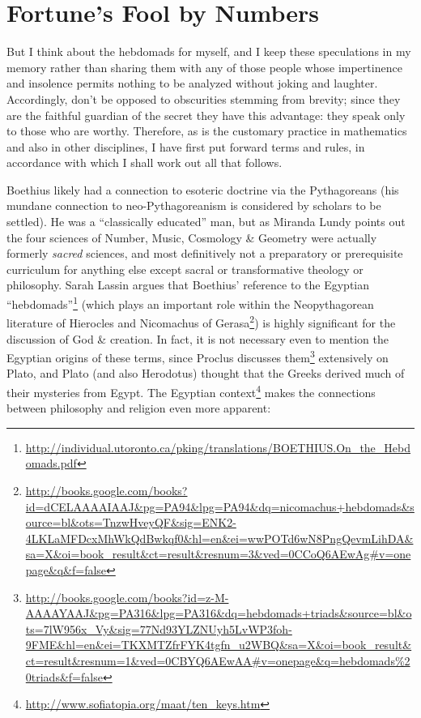 \section{Fortune’s Fool by Numbers}

\begin{quotex}
But I think about the hebdomads for myself, and I keep these speculations in my memory rather than sharing them with any of those people whose impertinence and insolence permits nothing to be analyzed without joking and laughter. Accordingly, don't be opposed to obscurities stemming from brevity; since they are the faithful guardian of the secret they have this advantage: they speak only to those who are worthy. Therefore, as is the customary practice in mathematics and also in other disciplines, I have first put forward terms and rules, in accordance with which I shall work out all that follows.
\end{quotex}


Boethius likely had a connection to esoteric doctrine via the Pythagoreans (his mundane connection to neo-Pythagoreanism is considered by scholars to be settled). He was a ``classically educated'' man, but as Miranda Lundy points out the four sciences of Number, Music, Cosmology \& Geometry were actually formerly \emph{sacred} sciences, and most definitively not a preparatory or prerequisite curriculum for anything else except sacral or transformative theology or philosophy. Sarah Lassin argues that Boethius' reference to the Egyptian ``hebdomads''\footnote{\url{http://individual.utoronto.ca/pking/translations/BOETHIUS.On\_the\_Hebdomads.pdf}} (which plays an important role within the Neopythagorean literature of Hierocles and Nicomachus of Gerasa\footnote{\url{http://books.google.com/books?id=dCELAAAAIAAJ\&pg=PA94\&lpg=PA94\&dq=nicomachus+hebdomads\&source=bl\&ots=TnzwHveyQF\&sig=ENK2-4LKLaMFDcxMhWkQdBwkqf0\&hl=en\&ei=wwPOTd6wN8PngQevmLihDA\&sa=X\&oi=book_result\&ct=result\&resnum=3\&ved=0CCoQ6AEwAg\#v=onepage\&q\&f=false}}) is highly significant for the discussion of God \& creation. In fact, it is not necessary even to mention the Egyptian origins of these terms, since Proclus discusses them\footnote{\url{http://books.google.com/books?id=z-M-AAAAYAAJ&pg=PA316&lpg=PA316&dq=hebdomads+triads&source=bl&ots=7lW956x_Vy&sig=77Nd93YLZNUyh5LvWP3foh-9FME&hl=en&ei=TKXMTZfrFYK4tgfn_u2WBQ&sa=X&oi=book_result&ct=result&resnum=1&ved=0CBYQ6AEwAA\#v=onepage&q=hebdomads\%20triads&f=false}} extensively on Plato, and Plato (and also Herodotus) thought that the Greeks derived much of their mysteries from Egypt. The Egyptian context\footnote{\url{http://www.sofiatopia.org/maat/ten_keys.htm}} makes the connections between philosophy and religion even more apparent:

